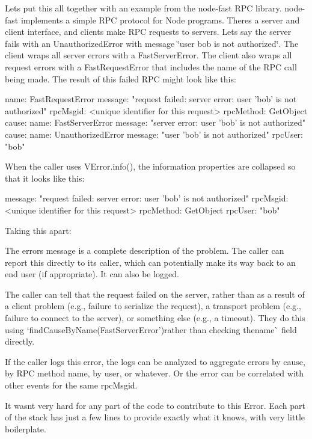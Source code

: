 Let\textquotesingle{}s put this all together with an example from the node-\/fast R\+PC library. node-\/fast implements a simple R\+PC protocol for Node programs. There\textquotesingle{}s a server and client interface, and clients make R\+PC requests to servers. Let\textquotesingle{}s say the server fails with an Unauthorized\+Error with message \char`\"{}user \textquotesingle{}bob\textquotesingle{} is not
authorized\char`\"{}. The client wraps all server errors with a Fast\+Server\+Error. The client also wraps all request errors with a Fast\+Request\+Error that includes the name of the R\+PC call being made. The result of this failed R\+PC might look like this\+: \begin{DoxyVerb}name: FastRequestError
message: "request failed: server error: user 'bob' is not authorized"
rpcMsgid: <unique identifier for this request>
rpcMethod: GetObject
cause:
    name: FastServerError
    message: "server error: user 'bob' is not authorized"
    cause:
        name: UnauthorizedError
        message: "user 'bob' is not authorized"
        rpcUser: "bob"
\end{DoxyVerb}


When the caller uses {\ttfamily V\+Error.\+info()}, the information properties are collapsed so that it looks like this\+: \begin{DoxyVerb}message: "request failed: server error: user 'bob' is not authorized"
rpcMsgid: <unique identifier for this request>
rpcMethod: GetObject
rpcUser: "bob"
\end{DoxyVerb}


Taking this apart\+:


\begin{DoxyItemize}
\item The error\textquotesingle{}s message is a complete description of the problem. The caller can report this directly to its caller, which can potentially make its way back to an end user (if appropriate). It can also be logged.
\item The caller can tell that the request failed on the server, rather than as a result of a client problem (e.\+g., failure to serialize the request), a transport problem (e.\+g., failure to connect to the server), or something else (e.\+g., a timeout). They do this using `find\+Cause\+By\+Name(\textquotesingle{}Fast\+Server\+Error'){\ttfamily  rather than checking the}name\`{} field directly.
\item If the caller logs this error, the logs can be analyzed to aggregate errors by cause, by R\+PC method name, by user, or whatever. Or the error can be correlated with other events for the same rpc\+Msgid.
\item It wasn\textquotesingle{}t very hard for any part of the code to contribute to this Error. Each part of the stack has just a few lines to provide exactly what it knows, with very little boilerplate.
\end{DoxyItemize}

